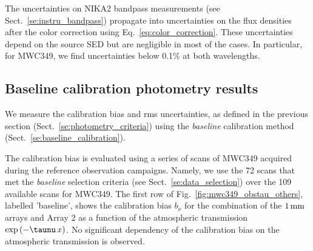 {The uncertainties on NIKA2 bandpass measurements (see
Sect.~\ref{se:instru_bandpass}) propagate into
uncertainties on the flux densities after the color correction using
Eq.~\ref{eq:color_correction}. These
uncertainties depend on the source SED but are negligible in most of
the cases. In particular, for MWC349, we find uncertainties below 0.1\% at
both wavelengths.}



\subsection{Baseline calibration photometry results}
\label{se:photometry_baseline}

We measure the calibration bias and rms uncertainties, as defined
in the previous section (Sect.~\ref{se:photometry_criteria}) using the
\emph{baseline} calibration method (Sect.~\ref{se:baseline_calibration}).

The calibration bias is evaluated using a
series of scans of MWC349 acquired during the
 reference observation campaigns. Namely, we use the 72 scans that met
 the \emph{baseline} selection
 criteria (see Sect.~\ref{se:data_selection}) over the 109 available
scans for MWC349. The first row of
Fig.~\ref{fig:mwc349_obstau_others}, labelled 'baseline', shows the
calibration bias $b_{\nu}$ for the combination of the $1\,\rm{mm}$ arrays and
Array 2 as a function of the atmospheric transmission %
$\exp \left( - \taunu \, x \right)$. No significant dependency of the
calibration bias on the atmospheric transmission is observed. 

